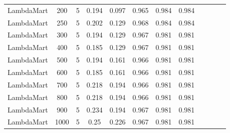 \begin{longtable}{*{12}{c}}
LambdaMart & 200 & 5 & 0.194 & 0.097 & 0.965 & 0.984 & 0.984 \\ 
LambdaMart & 250 & 5 & 0.202 & 0.129 & 0.968 & 0.984 & 0.984 \\ 
LambdaMart & 300 & 5 & 0.194 & 0.129 & 0.967 & 0.981 & 0.981 \\ 
LambdaMart & 400 & 5 & 0.185 & 0.129 & 0.967 & 0.981 & 0.981 \\ 
LambdaMart & 500 & 5 & 0.194 & 0.161 & 0.966 & 0.981 & 0.981 \\ 
LambdaMart & 600 & 5 & 0.185 & 0.161 & 0.966 & 0.981 & 0.981 \\ 
LambdaMart & 700 & 5 & 0.218 & 0.194 & 0.966 & 0.981 & 0.981 \\ 
LambdaMart & 800 & 5 & 0.218 & 0.194 & 0.966 & 0.981 & 0.981 \\ 
LambdaMart & 900 & 5 & 0.234 & 0.194 & 0.967 & 0.981 & 0.981 \\ 
LambdaMart & 1000 & 5 & 0.25 & 0.226 & 0.967 & 0.981 & 0.981 \\ 
\end{longtable}